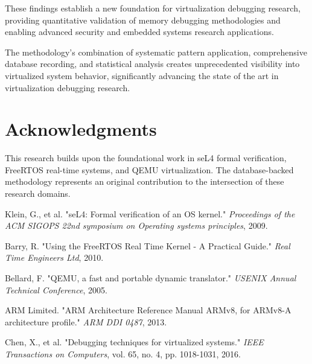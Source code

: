 \documentclass[11pt,a4paper]{article}
\begin{document}
These findings establish a new foundation for virtualization debugging research, providing quantitative validation of memory debugging methodologies and enabling advanced security and embedded systems research applications.

The methodology's combination of systematic pattern application, comprehensive database recording, and statistical analysis creates unprecedented visibility into virtualized system behavior, significantly advancing the state of the art in virtualization debugging research.

\section*{Acknowledgments}

This research builds upon the foundational work in seL4 formal verification, FreeRTOS real-time systems, and QEMU virtualization. The database-backed methodology represents an original contribution to the intersection of these research domains.

\begin{thebibliography}{9}

Klein, G., et al. "seL4: Formal verification of an OS kernel." \textit{Proceedings of the ACM SIGOPS 22nd symposium on Operating systems principles}, 2009.

Barry, R. "Using the FreeRTOS Real Time Kernel - A Practical Guide." \textit{Real Time Engineers Ltd}, 2010.

Bellard, F. "QEMU, a fast and portable dynamic translator." \textit{USENIX Annual Technical Conference}, 2005.

ARM Limited. "ARM Architecture Reference Manual ARMv8, for ARMv8-A architecture profile." \textit{ARM DDI 0487}, 2013.

Chen, X., et al. "Debugging techniques for virtualized systems." \textit{IEEE Transactions on Computers}, vol. 65, no. 4, pp. 1018-1031, 2016.

\end{thebibliography}
\end{document}
